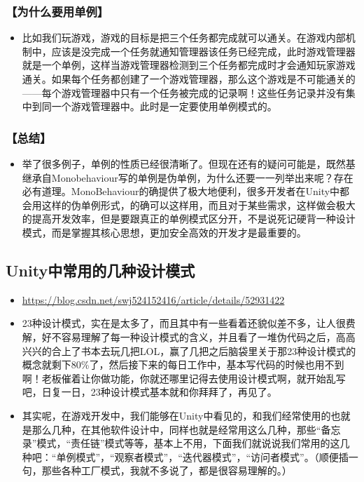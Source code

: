 \documentclass[9pt, b5paper]{article}
\begin{document}
\subsubsection{【为什么要用单例】}
\label{sec:orgc23b2ca}
\begin{itemize}
\item 比如我们玩游戏，游戏的目标是把三个任务都完成就可以通关。在游戏内部机制中，应该是没完成一个任务就通知管理器该任务已经完成，此时游戏管理器就是一个单例，这样当游戏管理器检测到三个任务都完成时才会通知玩家游戏通关。如果每个任务都创建了一个游戏管理器，那么这个游戏是不可能通关的——每个游戏管理器中只有一个任务被完成的记录啊！这些任务记录并没有集中到同一个游戏管理器中。此时是一定要使用单例模式的。
\end{itemize}
\subsubsection{【总结】}
\label{sec:orgeeebf83}
\begin{itemize}
\item 举了很多例子，单例的性质已经很清晰了。但现在还有的疑问可能是，既然基继承自Monobehaviour写的单例是伪单例，为什么还要一一列举出来呢？存在必有道理。MonoBehaviour的确提供了极大地便利，很多开发者在Unity中都会用这样的伪单例形式，的确可以这样用，而且对于某些需求，这样做会极大的提高开发效率，但是要跟真正的单例模式区分开，不是说死记硬背一种设计模式，而是掌握其核心思想，更加安全高效的开发才是最重要的。
\end{itemize}


\subsection{Unity中常用的几种设计模式}
\label{sec:org1bb6d6e}
\begin{itemize}
\item \url{https://blog.csdn.net/swj524152416/article/details/52931422}
\item 23种设计模式，实在是太多了，而且其中有一些看着还貌似差不多，让人很费解，好不容易理解了每一种设计模式的含义，并且看了一堆伪代码之后，高高兴兴的合上了书本去玩几把LOL，赢了几把之后脑袋里关于那23种设计模式的概念就剩下80\%了，然后接下来的每日工作中，基本写代码的时候也用不到啊！老板催着让你做功能，你就还哪里记得去使用设计模式啊，就开始乱写吧，日复一日，23种设计模式基本就和你拜拜了，再见了。
\item 其实呢，在游戏开发中，我们能够在Unity中看见的，和我们经常使用的也就是那么几种，在其他软件设计中，同样也就是经常用这么几种，那些“备忘录”模式，“责任链”模式等等，基本上不用，下面我们就说说我们常用的这几种吧：“单例模式”，“观察者模式”，“迭代器模式”，“访问者模式”。（顺便插一句，那些各种工厂模式，我就不多说了，都是很容易理解的。）
\end{itemize}
\end{document}
